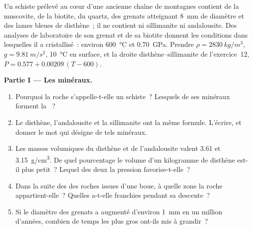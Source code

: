 \begin{problem}
\label{pb:g12:metamorphic-rocks:1}
Un schiste prélevé au cœur d'une ancienne chaîne de montagnes contient de la
muscovite, de la biotite, du quartz, des grenats atteignant \qty{8}{mm} de
diamètre et des lames bleues de disthène~; il ne contient ni sillimanite ni
andalousite. Des analyses de laboratoire de son grenat et de sa biotite
donnent les conditions dans lesquelles il a cristallisé~: environ
\qty{600}{\celsius} et \qty{0.70}{GPa}. Prendre $\rho =
\qty{2830}{kg/m^3}$, $g = \qty{9.81}{m/s^2}$, \qty{10}{\celsius} en
surface, et la droite disthène--sillimanite de l'exercice~12, $P = 0.577 +
0.00209\,(T - 600)$.

\medskip
\noindent\textbf{Partie I --- Les minéraux.}
\begin{enumerate}
  \item Pourquoi la roche s'appelle-t-elle un schiste~? Lesquels de ses
        minéraux forment la ~?
  \item Le disthène, l'andalousite et la sillimanite ont la même formule.
        L'écrire, et donner le mot qui désigne de tels minéraux.
  \item Les masses volumiques du disthène et de l'andalousite valent
        \num{3.61} et \qty{3.15}{g/cm^3}. De quel pourcentage le volume d'un
        kilogramme de disthène est-il plus petit~? Lequel des deux la
        pression favorise-t-elle~?
  \item Dans la suite des  des roches issues d'une boue, à
        quelle zone la roche appartient-elle~? Quelles  a-t-elle
        franchies pendant sa descente~?
  \item Si le diamètre des grenats a augmenté d'environ \qty{1}{mm} en un
        million d'années, combien de temps les plus gros ont-ils mis à
        grandir~?
\end{enumerate}


\end{problem}
